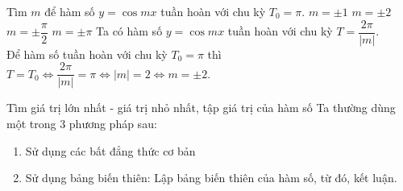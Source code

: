\begin{ex}%
	Tìm $m$ để hàm số $y=\cos mx$ tuần hoàn với chu kỳ $T_0=\pi$.
	\choice
	{$m=\pm1$}
	{\True $m=\pm2$}
	{$m=\pm\dfrac{\pi}{2}$}
	{$m=\pm\pi$}
	\loigiai
	{
		Ta có hàm số $y=\cos mx$ tuần hoàn với chu kỳ $T=\dfrac{2\pi}{|m|}$.\\
		Để hàm số tuần hoàn với chu kỳ $T_0=\pi$ thì $T=T_0\Leftrightarrow \dfrac{2\pi}{|m|}=\pi\Leftrightarrow |m|=2\Leftrightarrow m=\pm2$.
	}
\end{ex}
\begin{dang}{Tìm giá trị lớn nhất - giá trị nhỏ nhất, tập giá trị của hàm số}
	Ta thường dùng một trong 3 phương pháp sau:
	\begin{enumerate}[\faCheckSquareO]
		\item Sử dụng các bất đẳng thức cơ bản
		\item Sử dụng bảng biến thiên: Lập bảng biến thiên của hàm số, từ đó, kết luận.
	\end{enumerate}
\end{dang}

